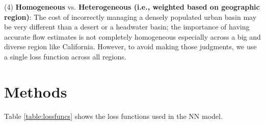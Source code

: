 (4) \textbf{Homogeneous} vs. \textbf{Heterogeneous (i.e., weighted based on geographic region)}: The cost of incorrectly managing a densely populated urban basin may be very different than a desert or a headwater basin; the importance of having accurate flow estimates is not completely homogeneous especially across a big and diverse region like California. However, to avoid making those judgments, we use a single loss function across all regions. 


\section{Methods}
Table \ref{table:lossfuncs} shows the loss functions used in the NN model. 

